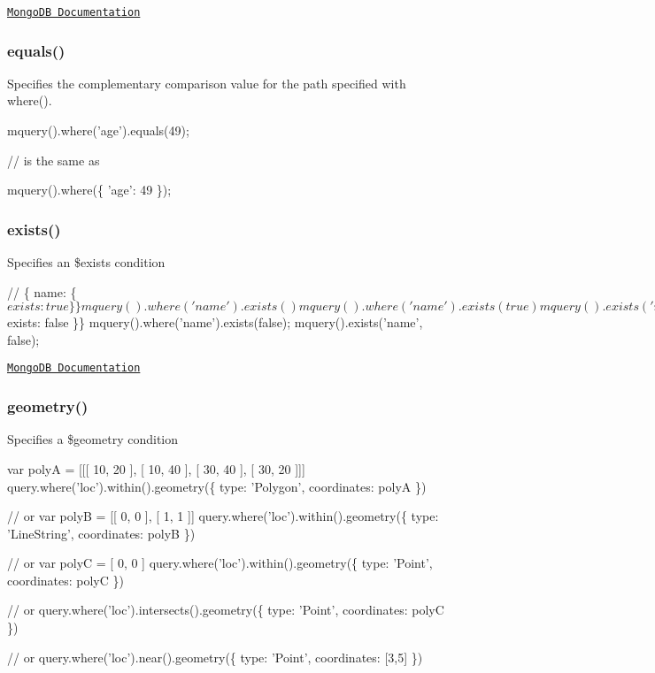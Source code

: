 \href{http://docs.mongodb.org/manual/reference/operator/elemMatch/}{\tt Mongo\+DB Documentation}

\subsubsection*{equals()}

Specifies the complementary comparison value for the path specified with {\ttfamily where()}.


\begin{DoxyCode}
mquery().where('age').equals(49);

// is the same as

mquery().where(\{ 'age': 49 \});
\end{DoxyCode}


\subsubsection*{exists()}

Specifies an {\ttfamily \$exists} condition


\begin{DoxyCode}
// \{ name: \{ $exists: true \}\}
mquery().where('name').exists()
mquery().where('name').exists(true)
mquery().exists('name')

// \{ name: \{ $exists: false \}\}
mquery().where('name').exists(false);
mquery().exists('name', false);
\end{DoxyCode}


\href{http://docs.mongodb.org/manual/reference/operator/exists/}{\tt Mongo\+DB Documentation}

\subsubsection*{geometry()}

Specifies a {\ttfamily \$geometry} condition


\begin{DoxyCode}
var polyA = [[[ 10, 20 ], [ 10, 40 ], [ 30, 40 ], [ 30, 20 ]]]
query.where('loc').within().geometry(\{ type: 'Polygon', coordinates: polyA \})

// or
var polyB = [[ 0, 0 ], [ 1, 1 ]]
query.where('loc').within().geometry(\{ type: 'LineString', coordinates: polyB \})

// or
var polyC = [ 0, 0 ]
query.where('loc').within().geometry(\{ type: 'Point', coordinates: polyC \})

// or
query.where('loc').intersects().geometry(\{ type: 'Point', coordinates: polyC \})

// or
query.where('loc').near().geometry(\{ type: 'Point', coordinates: [3,5] \})
\end{DoxyCode}


